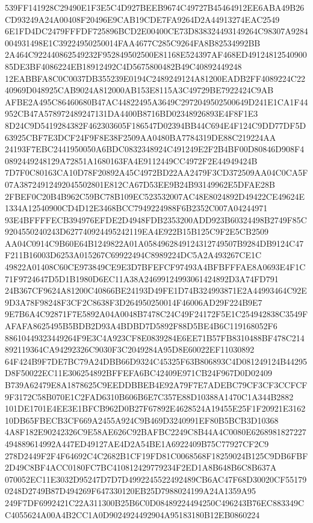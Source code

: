 \documentclass[UTF8,fontset=fandol,zihao=-4,a4paper]{ctexart}
\begin{document}
{{539FF141928C29490E1F3E5C4D927BEEB9674C49727B45464912EE6ABA49B26CD93249A24A00408F20496E9CAB19CDE7FA9264D2A44913274EAC2549
6E1FD4DC2479FFFDF725896BCD2E00400CE73D838324493149264C98307A9284004931498E1C39224950250014FAA4677C285C9264FA8B82534992BB
2A464C922440862549232F952849502500E81168E524397AF468ED4912481254090085DE3BF4086224EB18912492C4D5675800482B49C40892449248
12EABBFA8C0C0037DB355239E0194C2489249124A81200EADB2FF4089224C2240969D048925CAB9024A812000AB153E8115A3C49729BE7922424C9AB
AFBE2A495C86460680B47AC44822495A3649C2972049502500649D241E1CA1F44952CB47A578972489247131DA4400B8716BD02348926893E4F8F1E3
8D24C9D5419284382F462303605F186547D02394BB44C694E4F124C9DD77DF5D63925CBF7E3DCF24F9F8E38F2509AA0480BA7784319DE88C219224AA
24193F7EBC2441950050A6BDC0832348924C491249E2F2B4BF00D80846D908F40892449248129A72851A1680163FA4E9112449CC4972F2E44949424B
7D7F0C80163CA10D78F20892A45C4972BD22AA2479F3CD372509AA04C0CA5F07A38724912492045502801E812CA67D53EE9B24B93149962E5DFAE28B
2FBEF0C20B4B962C59BC78B109EC523532007AC48E8024892D49422CE49624E1334A12540900CD4D12E3468BCC7949224988F6B2352C007A04244971
93E4BFFFFECB394976EFDE2D4948FDB2353200ADD923B60324498B2749F85C9204550240243D627740924495242119EA4E922B15B125C9F2E5CB2509
AA04C0914C9B60E64B1249822A01A0584962849124312749507B9284DB9124C47F211B16003D6253A015267C69922494C8989224DC5A2A493267CE1C
49822A01408C60CE973849CE9E3D7BFEFCF97493A4BFBFFFAE8A0693E4F1C71F9724647D5D1B1980D6EC11A38A24699124993061424892D3A74FD791
24B367CF9624A81200C40866BE24193D49FE1D74B324993871E2A44993464C92E9D3A78F98248F3CF2C8638F3D264950250014F46006AD29F224B9E7
9E7B6A4C92871F7E5892A04A0048B7478C24C49F24172F5E1C254942838C3549FAFAFA8625495B5BDB2D93A4BDBD7D5892F88D5BE4B6C119168052F6
88610449323449264F9E3C4A923CF8E0839284E6EE71B57FB8310488BF478C214892119364CA94292326C9030F3C2049284A95D8E60022EF11030892
64F424B9F7DE7BC79A24DBB66D9324C45325F63B806893C4D081249124B44295D8F50022EC11E306254892BFFEFA6BC42409E971CB24F967D0D02409
B739A62479E8A1878625C9EEDDBBEB4E92A79F7E7ADEBC79CF3CF3CCFCF9F3172C58B070E1C2FAD6310B606B6E7C357E88D10388A1470C1A344B2882
101DE1701E4EE3E1BFCB962D0B27F67892E4628524A19455E25F1F20921E316210DB65FBECB3CF669A2455A924C9B469D3240991EF80B5BCB3D10368
4A8F182E90242326C9E58AE626C92BAFBC2249C8B44A4C0080E6268981827227494889614992A447ED49127AE4D2A54BE1A6922409B75C77927CF2C9
278D2449F2F4F64692C4C2682B1CF19FD81C0068568F18259024B125C9DB6FBF2D49C8BF4ACC0180FC7BC410812429779234F2ED1A8B648B6C8B637A
070052EC11E3032D95247D7D7D4992245522492489CB6AC47F68D30020CF551790248D2749B87D494269F647330120EB25D7988024199A24A1359A95
249F7DF6992421C22A311300B25B6C0D08489224494250C496243B76EC883349CC4055624A00A4B2CC1A0D9024924492904A95183180B12EB0860224
}}
\end{document}

